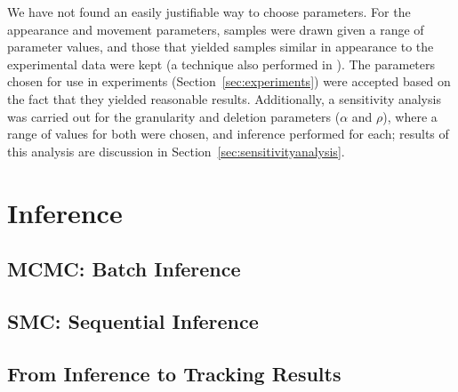\documentclass[twocolumn, final]{svjour3}
\begin{document}
We have not found an easily justifiable way to choose parameters. For the appearance and movement parameters, samples were drawn given a range of parameter values, and those that yielded samples similar in appearance to the experimental data were kept (a technique also performed in \cite{gasthaus_thesis}). The parameters chosen for use in experiments (Section~\ref{sec:experiments}) were accepted based on the fact that they yielded reasonable results. Additionally, a sensitivity analysis was carried out for the granularity and deletion parameters ($\alpha$ and $\rho$), where a range of values for both were chosen, and inference performed for each; results of this analysis are discussion in Section~\ref{sec:sensitivityanalysis}.




\section{Inference}
\label{sec:inference}


\subsection{MCMC: Batch Inference}
\label{sec:MCMC}


\subsection{SMC: Sequential Inference}
\label{sec:SMC}


\subsection{From Inference to Tracking Results}
\label{sec:inferencetotrackingresults}
\end{document}
